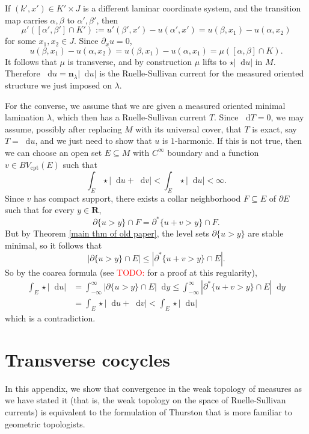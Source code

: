 \documentclass[reqno,11pt]{amsart}
\newcommand{\RR}{\mathbf{R}}
\newcommand*\dif{\mathop{}\!\mathrm{d}}
\newcommand{\normal}{\mathbf n}
\newcommand{\cpt}{\mathrm{cpt}}
\theoremstyle{definition}
\numberwithin{equation}{section}
\newcommand\todo[1]{\textcolor{red}{TODO: #1}}
\begin{document}
If $(k', x') \in K' \times J$ is a different laminar coordinate system, and the transition map carries $\alpha, \beta$ to $\alpha', \beta'$, then
$$\mu'([\alpha', \beta'] \cap K') := u'(\beta', x') - u(\alpha', x') = u(\beta, x_1) - u(\alpha, x_2)$$
for some $x_1, x_2 \in J$. Since $\partial_x u = 0$,
$$u(\beta, x_1) - u(\alpha, x_2) = u(\beta, x_1) - u(\alpha, x_1) = \mu([\alpha, \beta] \cap K).$$
It follows that $\mu$ is transverse, and by construction $\mu$ lifts to $\star |\dif u|$ in $M$.
Therefore $\dif u = \normal_\lambda |\dif u|$ is the Ruelle-Sullivan current for the measured oriented structure we just imposed on $\lambda$.

For the converse, we assume that we are given a measured oriented minimal lamination $\lambda$, which then has a Ruelle-Sullivan current $T$.
Since $\dif T = 0$, we may assume, possibly after replacing $M$ with its universal cover, that $T$ is exact, say $T = \dif u$, and we just need to show that $u$ is $1$-harmonic.
If this is not true, then we can choose an open set $E \subseteq M$ with $C^\infty$ boundary and a function $v \in BV_\cpt(E)$ such that
$$\int_E \star |\dif u + \dif v| < \int_E \star |\dif u| < \infty.$$
Since $v$ has compact support, there exists a collar neighborhood $F \subseteq E$ of $\partial E$ such that for every $y \in \RR$,
$$\partial \{u > y\} \cap F = \partial^* \{u + v > y\} \cap F.$$
But by Theorem \ref{main thm of old paper}, the level sets $\partial \{u > y\}$ are stable minimal, so it follows that
$$|\partial \{u > y\} \cap E| \leq |\partial^* \{u + v > y\} \cap E|.$$
So by the coarea formula (see \todo{\cite{BackusFLG}} for a proof at this regularity),
\begin{align*}
\int_E \star |\dif u| &= \int_{-\infty}^\infty |\partial \{u > y\} \cap E| \dif y \leq \int_{-\infty}^\infty |\partial^* \{u + v > y\} \cap E| \dif y \\
&= \int_E \star |\dif u + \dif v| < \int_E \star |\dif u|
\end{align*}
which is a contradiction.




\appendix \section{Transverse cocycles}\label{transverse curves}
In this appendix, we show that convergence in the weak topology of measures as we have stated it (that is, the weak topology on the space of Ruelle-Sullivan currents) is equivalent to the formulation of Thurston \cite[\S8.6]{thurston1979geometry} that is more familiar to geometric topologists.
\end{document}
